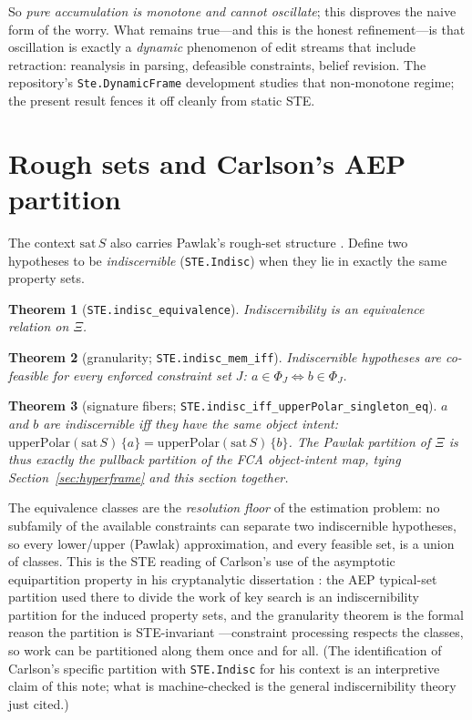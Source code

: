 \documentclass[11pt]{article}
\newtheorem{theorem}{Theorem}
\newcommand{\lean}[1]{\texttt{#1}}
\begin{document}
So \emph{pure accumulation is monotone and cannot oscillate}; this
disproves the naive form of the worry.  What remains true---and this is
the honest refinement---is that oscillation is exactly a
\emph{dynamic} phenomenon of edit streams that include retraction:
reanalysis in parsing, defeasible constraints, belief revision.  The
repository's \lean{Ste.DynamicFrame} development studies that
non-monotone regime; the present result fences it off cleanly from
static STE.

\section{Rough sets and Carlson's AEP partition}
\label{sec:rough}

The context $\mathrm{sat}\,S$ also carries Pawlak's rough-set structure
\citep{pawlak1982rough}.  Define two hypotheses to be
\emph{indiscernible} (\lean{STE.Indisc}) when they lie in exactly the
same property sets.

\begin{theorem}[\lean{STE.indisc\_equivalence}]
Indiscernibility is an equivalence relation on $\Xi$.
\end{theorem}

\begin{theorem}[granularity; \lean{STE.indisc\_mem\_iff}]
Indiscernible hypotheses are co-feasible for every enforced constraint
set $J$: $a \in \Phi_J \iff b \in \Phi_J$.
\end{theorem}

\begin{theorem}[signature fibers;
\lean{STE.indisc\_iff\_upperPolar\_singleton\_eq}]
$a$ and $b$ are indiscernible iff they have the same object intent:
$\mathrm{upperPolar}(\mathrm{sat}\,S)\,\{a\} =
 \mathrm{upperPolar}(\mathrm{sat}\,S)\,\{b\}$.  The Pawlak partition of
$\Xi$ is thus exactly the pullback partition of the FCA object-intent
map, tying Section~\ref{sec:hyperframe} and this section together.
\end{theorem}

The equivalence classes are the \emph{resolution floor} of the
estimation problem: no subfamily of the available constraints can
separate two indiscernible hypotheses, so every lower/upper (Pawlak)
approximation, and every feasible set, is a union of classes.  This is
the STE reading of Carlson's use of the asymptotic equipartition
property in his cryptanalytic dissertation \citep{carlson2012}: the
AEP typical-set partition used there to divide the work of key search
is an indiscernibility partition for the induced property sets, and the
granularity theorem is the formal reason the partition is STE-invariant
---constraint processing respects the classes, so work can be
partitioned along them once and for all.  (The identification of
Carlson's specific partition with \lean{STE.Indisc} for his context is
an interpretive claim of this note; what is machine-checked is the
general indiscernibility theory just cited.)
\end{document}
